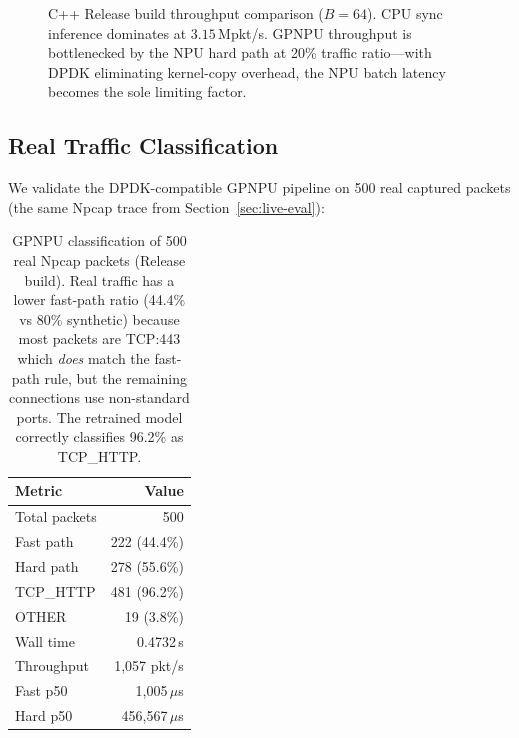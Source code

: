 \documentclass[11pt,a4paper,twoside]{article}
\theoremstyle{definition}
\theoremstyle{remark}
\begin{document}
\begin{figure}[H]
\centering
{}
\caption{C++ Release build throughput comparison ($B = 64$). CPU sync inference dominates at $3.15$\,Mpkt/s. GPNPU throughput is bottlenecked by the NPU hard path at 20\% traffic ratio---with DPDK eliminating kernel-copy overhead, the NPU batch latency becomes the sole limiting factor.}
\label{fig:release-throughput}
\end{figure}

\subsection{Real Traffic Classification}

We validate the DPDK-compatible GPNPU pipeline on 500 real captured packets (the same Npcap trace from Section~\ref{sec:live-eval}):

\begin{table}[H]
\centering
\small
\begin{tabular}{lr}
\toprule
\textbf{Metric} & \textbf{Value} \\
\midrule
Total packets   & 500 \\
Fast path       & 222 (44.4\%) \\
Hard path       & 278 (55.6\%) \\
\midrule
TCP\_HTTP       & 481 (96.2\%) \\
OTHER           & 19 (3.8\%) \\
\midrule
Wall time       & 0.4732\,s \\
Throughput      & 1{,}057 pkt/s \\
\midrule
Fast p50        & 1{,}005\,$\mu$s \\
Hard p50        & 456{,}567\,$\mu$s \\
\bottomrule
\end{tabular}
\caption{GPNPU classification of 500 real Npcap packets (Release build). Real traffic has a lower fast-path ratio (44.4\% vs 80\% synthetic) because most packets are TCP:443 which \emph{does} match the fast-path rule, but the remaining connections use non-standard ports. The retrained model correctly classifies 96.2\% as TCP\_HTTP.}
\label{tab:real-traffic-gpnpu}
\end{table}
\end{document}
